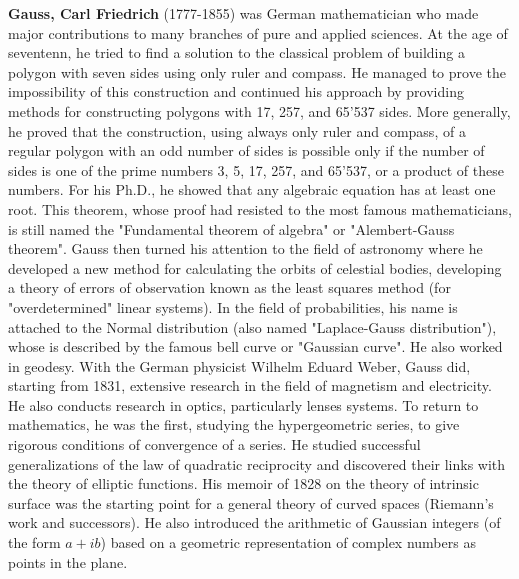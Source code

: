 \textbf{Gauss, Carl Friedrich} (1777-1855) was German mathematician who made major contributions to many branches of pure and applied sciences. At the age of seventenn, he tried to find a solution to the classical problem of building a polygon with seven sides using only ruler and compass. He managed to prove the impossibility of this construction and continued his approach by providing methods for constructing polygons with 17, 257, and 65'537 sides. More generally, he proved that the construction, using always only ruler and compass, of a regular polygon with an odd number of sides is possible only if the number of sides is one of the prime numbers 3, 5, 17, 257, and 65'537, or a product of these numbers. For his Ph.D., he showed that any algebraic equation has at least one root. This theorem, whose proof had resisted to the most famous mathematicians, is still named the "Fundamental theorem of algebra" or "Alembert-Gauss theorem". Gauss then turned his attention to the field of astronomy where he developed a new method for calculating the orbits of celestial bodies, developing a theory of errors of observation known as the least squares method (for "overdetermined" linear systems). In the field of probabilities, his name is attached to the Normal distribution (also named "Laplace-Gauss distribution"), whose is described by the famous bell curve or "Gaussian curve". He also worked in geodesy. With the German physicist Wilhelm Eduard Weber, Gauss did, starting from 1831, extensive research in the field of magnetism and electricity. He also conducts research in optics, particularly lenses systems. To return to mathematics, he was the first, studying the hypergeometric series, to give rigorous conditions of convergence of a series. He studied successful generalizations of the law of quadratic reciprocity and discovered their links with the theory of elliptic functions. His memoir of 1828 on the theory of intrinsic surface was the starting point for a general theory of curved spaces (Riemann's work and successors). He also introduced the arithmetic of Gaussian integers (of the form $a+ib$) based on a geometric representation of complex numbers as points in the plane.

